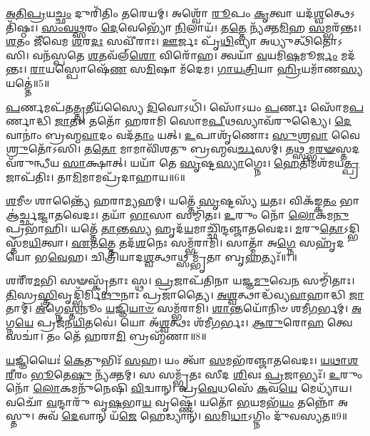 \-\ul{𑌅}\-\-\ul{𑌤𑌿}\-\-\ul{𑌪𑍍𑌰}\-𑌯\-\ul{𑌚𑍍𑌛𑌂} 𑌦𑍁𑌰𑌿᳴𑌤𑌿𑌂 𑌤𑌰𑍇𑌯𑌮𑍍।
𑌅𑌶𑍍𑌵𑍋᳴ \ul{𑌰𑍂}\-𑌪𑌂 \ul{𑌕𑍃}\-𑌤𑍍𑌵𑌾 𑌯𑌦᳴\-\ul{𑌶𑍍𑌵}\-𑌤𑍍𑌥𑍇\-𑌽𑌤𑌿᳴𑌷𑍍𑌠𑌃।
\-\ul{𑌸𑌂}\-\-\ul{𑌵}\-\-\ul{𑌥𑍍𑌸}\-𑌰𑌂 \ul{𑌦𑍇}\-𑌵𑍇𑌭𑍍𑌯𑍋᳴ \ul{𑌨𑌿}\-𑌲𑌾𑌯᳴।
𑌤\-\ul{𑌤𑍍𑌤𑍇} 𑌨𑍍𑌯᳴𑌕𑍍𑌤\-\ul{𑌮𑌿}\-𑌹 \ul{𑌸}\-𑌮𑍍𑌭𑌰᳴𑌨𑍍𑌤𑌃।
\-\ul{𑌶}\-𑌤𑌂 𑌜𑍀᳴𑌵𑍇𑌮 \ul{𑌶}\-𑌰\-\ul{𑌦𑌃} 𑌸𑌵𑍀᳴𑌰𑌾𑌃।
\-\ul{𑌊}\-𑌰𑍍𑌜𑌃 𑌪𑍃᳴\-\ul{𑌥𑌿}\-𑌵𑍍𑌯𑌾 𑌅𑌧𑍍𑌯𑍁𑌤𑍍𑌥𑌿᳴𑌤𑍋𑌽𑌸𑌿।
𑌵𑌨᳴𑌸𑍍𑌪𑌤𑍇 \ul{𑌶}\-𑌤𑌵᳴𑌲𑍍‌\-\ul{𑌶𑍋} 𑌵𑌿𑌰𑍋᳴𑌹।
𑌤𑍍𑌵𑌯𑌾᳴ \ul{𑌵}\-𑌯𑌮𑌿\-\ul{𑌷}\-𑌮𑍂\-\ul{𑌰𑍍𑌜𑌂} 𑌮𑌦᳴𑌨𑍍𑌤𑌃।
\-\ul{𑌰𑌾}\-𑌯𑌸𑍍𑌪𑍋𑌷𑍇᳴\-\ul{𑌣} 𑌸\-\ul{𑌮𑌿}\-𑌷𑌾 𑌮᳴𑌦𑍇𑌮।
\-\ul{𑌗𑌾}\-\-\ul{𑌯}\-\-\ul{𑌤𑍍𑌰𑌿}\-𑌯𑌾 \ul{𑌹𑍍𑌰𑌿}\-𑌯𑌮𑌾᳴𑌣\-\ul{𑌸𑍍𑌯} 𑌯𑌤𑍍𑌤𑍇॑॥5॥

\-\ul{𑌪}\-𑌰𑍍𑌣𑌮𑌪᳴𑌤\-\ul{𑌤𑍍𑌤𑍃}\-𑌤𑍀𑌯᳴𑌸𑍍𑌯𑍈 \ul{𑌦𑌿}\-𑌵𑍋𑌽𑌧𑌿᳴।
𑌸𑍋᳴𑌽𑌯𑌂 \ul{𑌪}\-𑌰𑍍𑌣𑌃 𑌸𑍋᳴𑌮\-\ul{𑌪}\-𑌰𑍍𑌣𑌾𑌦𑍍𑌧𑌿 \ul{𑌜𑌾}\-𑌤𑌃।
𑌤𑌤𑍋᳴ 𑌹𑌰𑌾𑌮𑌿 𑌸𑍋𑌮\-\ul{𑌪𑍀}\-𑌥𑌸𑍍𑌯𑌾𑌵᳴𑌰𑍁𑌦𑍍𑌧𑍍𑌯𑍈।
\-\ul{𑌦𑍇}\-𑌵𑌾𑌨𑌾𑌂॑ 𑌬𑍍𑌰𑌹𑍍𑌮\-\ul{𑌵𑌾}\-𑌦𑌂 𑌵𑌦᳴\-\ul{𑌤𑌾𑌂} 𑌯𑌤𑍍।
\-\ul{𑌉}\-𑌪𑌾𑌶𑍃᳴𑌣𑍋𑌃 \ul{𑌸𑍁}\-𑌶𑍍𑌰\-\ul{𑌵𑌾} 𑌵𑍈 \ul{𑌶𑍍𑌰𑍁}\-𑌤𑍋᳴𑌽𑌸𑌿।
𑌤\-\ul{𑌤𑍋} 𑌮𑌾𑌮𑌾𑌵𑌿᳴𑌶𑌤𑍁 𑌬𑍍𑌰𑌹𑍍𑌮𑌵\-\ul{𑌰𑍍𑌚}\-𑌸𑌮𑍍।
𑌤\-\ul{𑌥𑍍𑌸}\-𑌮𑍍𑌭\-\ul{𑌰}\-\-\ul{𑍟}\-𑌸𑍍𑌤𑌦𑌵᳴𑌰𑍁𑌨𑍍𑌧𑍀𑌯 \ul{𑌸𑌾}\-𑌕𑍍𑌷𑌾𑌤𑍍।
𑌯𑌯𑌾᳴ 𑌤𑍇 \ul{𑌸𑍃}\-𑌷𑍍𑌟\-\ul{𑌸𑍍𑌯𑌾}\-𑌗𑍍𑌨𑍇𑌃।
\-\ul{𑌹𑍇}\-𑌤𑌿𑌮𑌶᳴𑌮𑌯\-\ul{𑌤𑍍𑌪𑍍𑌰}\-𑌜𑌾\-𑌪᳴𑌤𑌿𑌃।
𑌤𑌾\-\ul{𑌮𑌿}\-𑌮𑌾𑌮𑌪𑍍𑌰᳴𑌦𑌾𑌹𑌾𑌯॥6॥

\-\ul{𑌶}\-𑌮𑍀𑍞 𑌶𑌾𑌨𑍍𑌤𑍍𑌯𑍈᳴ 𑌹𑌰𑌾\-\ul{𑌮𑍍𑌯}\-𑌹𑌮𑍍।
𑌯𑌤𑍍𑌤𑍇᳴ \ul{𑌸𑍃}\-𑌷𑍍𑌟𑌸𑍍𑌯᳴ \ul{𑌯}\-𑌤𑌃।
𑌵𑌿𑌕᳴𑌙𑍍𑌕\-\ul{𑌤𑌂} 𑌭𑌾 𑌆॑𑌰𑍍𑌚𑍍𑌛𑌜𑍍𑌜𑌾𑌤𑌵𑍇𑌦𑌃।
𑌤𑌯𑌾᳴ \ul{𑌭𑌾}\-𑌸𑌾 𑌸𑌮𑍍𑌮𑌿᳴𑌤𑌃।
\-\ul{𑌉}\-𑌰𑍁𑌂 𑌨𑍋᳴ \ul{𑌲𑍋}\-𑌕𑌮\-\ul{𑌨𑍁} 𑌪𑍍𑌰𑌭𑌾᳴𑌹𑌿।
𑌯𑌤𑍍𑌤𑍇᳴ \ul{𑌤𑌾}\-𑌨𑍍𑌤\-\ul{𑌸𑍍𑌯} 𑌹𑍃𑌦᳴\-\ul{𑌯}\-𑌮𑌾𑌚𑍍𑌛𑌿᳴𑌨𑍍𑌦𑌞𑍍𑌜𑌾𑌤𑌵𑍇𑌦𑌃।
\-\ul{𑌮}\-𑌰𑍁\-\ul{𑌤𑍋}\-\-𑌽𑌦𑍍𑌭𑌿𑌸𑍍𑌤᳴𑌮\-\ul{𑌯𑌿}\-𑌤𑍍𑌵𑌾।
\-\ul{𑌏}\-𑌤\-\ul{𑌤𑍍𑌤𑍇} 𑌤𑌦᳴\-\ul{𑌶}\-𑌨𑍇𑌃 𑌸𑌮𑍍𑌭᳴𑌰𑌾𑌮𑌿।
𑌸𑌾𑌤𑍍𑌮𑌾᳴ 𑌅\-\ul{𑌗𑍍𑌨𑍇} 𑌸𑌹𑍃᳴𑌦𑌯𑍋 𑌭\-\ul{𑌵𑍇}\-𑌹।
𑌚𑌿𑌤𑍍𑌰𑌿᳴𑌯𑌾𑌦\-\ul{𑌶𑍍𑌵}\-𑌤𑍍𑌥𑌾𑌥𑍍𑌸𑌮𑍍𑌭𑍃᳴𑌤𑌾 𑌬𑍃\-\ul{𑌹}\-𑌤𑍍𑌯𑌃᳴॥7॥

𑌶𑌰𑍀᳴𑌰\-\ul{𑌮}\-𑌭𑌿 𑌸𑍟𑌸𑍍𑌕𑍃᳴𑌤𑌾𑌃 𑌸𑍍𑌥।
\-\ul{𑌪𑍍𑌰}\-𑌜𑌾𑌪᳴𑌤𑌿𑌨𑌾 𑌯𑌜𑍍𑌞\-\ul{𑌮𑍁}\-𑌖𑍇\-\ul{𑌨} 𑌸𑌮𑍍𑌮𑌿᳴𑌤𑌾𑌃।
\-\ul{𑌤𑌿}\-𑌸𑍍𑌰\-\ul{𑌸𑍍𑌤𑍍𑌰𑌿}\-𑌵𑍃𑌦𑍍𑌭𑌿᳴𑌰𑍍𑌮𑌿\-\ul{𑌥𑍁}\-𑌨𑌾𑌃 𑌪𑍍𑌰𑌜𑌾॑𑌤𑍍𑌯𑍈।
\-\ul{𑌅}\-\-\ul{𑌶𑍍𑌵}\-𑌤𑍍𑌥𑌾𑌦𑍍𑌧᳴𑌵𑍍𑌯\-\-\ul{𑌵𑌾}\-𑌹𑌾𑌦𑍍𑌧𑌿 \ul{𑌜𑌾}\-𑌤𑌾𑌮𑍍।
\-\ul{𑌅}\-𑌗𑍍𑌨𑍇\-\ul{𑌸𑍍𑌤}\-𑌨𑍂𑌂 \ul{𑌯}\-𑌜𑍍𑌞𑌿\-\ul{𑌯𑌾}\-\-\ul{𑍞} 𑌸𑌮𑍍𑌭᳴𑌰𑌾𑌮𑌿।
\-\ul{𑌶𑌾}\-𑌨𑍍𑌤𑌯𑍋᳴𑌨𑌿𑍞 𑌶𑌮𑍀\-\ul{𑌗}\-𑌰𑍍𑌭𑌮𑍍।
\-\ul{𑌅}\-𑌗𑍍𑌨\-\ul{𑌯𑍇} 𑌪𑍍𑌰𑌜᳴𑌨\-\ul{𑌯𑌿}\-𑌤𑌵𑍇॑।
𑌯𑍋 𑌅᳴\-\ul{𑌶𑍍𑌵}\-𑌤𑍍𑌥𑌃 𑌶᳴𑌮𑍀\-\ul{𑌗}\-𑌰𑍍𑌭𑌃।
\-\ul{𑌆}\-\-\ul{𑌰𑍁}\-𑌰𑍋\-\ul{𑌹} 𑌤𑍍𑌵𑍇 𑌸𑌚𑌾॑।
𑌤𑌂 𑌤𑍇᳴ 𑌹𑌰𑌾\-\ul{𑌮𑌿} 𑌬𑍍𑌰𑌹𑍍𑌮᳴𑌣𑌾॥8॥

\-\ul{𑌯}\-𑌜𑍍𑌞𑌿𑌯𑍈𑌃॑ \ul{𑌕𑍇}\-𑌤𑍁𑌭𑌿𑌃᳴ \ul{𑌸}\-𑌹।
𑌯𑌂 𑌤𑍍𑌵𑌾᳴ \ul{𑌸}\-𑌮𑌭᳴𑌰𑌞𑍍𑌜𑌾𑌤𑌵𑍇𑌦𑌃।
\-\ul{𑌯}\-\-\ul{𑌥𑌾}\-\-\ul{𑌶}\-\-\ul{𑌰𑍀}\-𑌰𑌂 \ul{𑌭𑍂}\-𑌤𑍇\-\ul{𑌷𑍁} 𑌨𑍍𑌯᳴𑌕𑍍𑌤𑌮𑍍।
𑌸 𑌸𑌮𑍍𑌭𑍃᳴𑌤𑌃 𑌸𑍀𑌦 \ul{𑌶𑌿}\-𑌵𑌃 \ul{𑌪𑍍𑌰}\-𑌜𑌾𑌭𑍍𑌯𑌃᳴।
\-\ul{𑌉}\-𑌰𑍁𑌂 𑌨𑍋᳴ \ul{𑌲𑍋}\-𑌕𑌮𑌨𑍁᳴𑌨𑍇𑌷𑌿 \ul{𑌵𑌿}\-𑌦𑍍𑌵𑌾𑌨𑍍।
𑌪𑍍𑌰\-\ul{𑌵𑍇}\-𑌧𑌸𑍇᳴ \ul{𑌕}\-𑌵\-\ul{𑌯𑍇} 𑌮𑍇𑌧𑍍𑌯𑌾᳴𑌯।
𑌵𑌚𑍋᳴ \ul{𑌵}\-𑌨𑍍𑌦𑌾𑌰𑍁᳴ 𑌵𑍃\-\ul{𑌷}\-𑌭𑌾\-\ul{𑌯} 𑌵𑍃𑌷𑍍𑌣𑍇॑।
𑌯𑌤𑍋᳴ \ul{𑌭}\-𑌯𑌮𑌭᳴\-\ul{𑌯𑌂} 𑌤𑌨𑍍𑌨𑍋᳴ 𑌅𑌸𑍍𑌤𑍁।
𑌅𑌵᳴ \ul{𑌦𑍇}\-𑌵𑌾𑌨𑍍 𑌯᳴\-\ul{𑌜𑍇} 𑌹𑍇𑌡𑍍𑌯𑌾𑌨𑍍᳴।
\-\ul{𑌸}\-𑌮𑌿\-\ul{𑌧𑌾}\-\-𑌽𑌗𑍍𑌨𑌿𑌂 𑌦𑍁᳴𑌵𑌸𑍍𑌯𑌤॥9॥

